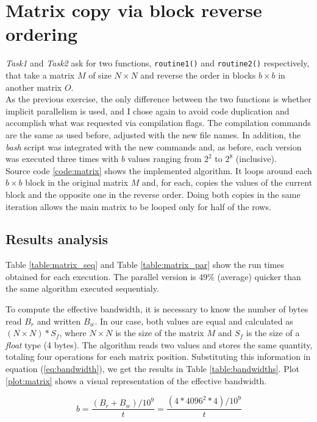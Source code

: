 \section{Matrix copy via block reverse ordering}
\textit{Task1} and \textit{Task2} ask for two functions, \texttt{routine1()} and \texttt{routine2()} respectively, that %
take a matrix $M$ of size $N\times N$ and reverse the order in blocks $b\times b$ in another matrix $O$.\\%
As the previous exercise, the only difference between the two functions is whether implicit parallelism is used, %
and I chose again to avoid code duplication and accomplish what was requested via compilation flags.
The compilation commands are the same as used before, adjusted with the new file names. In addition, the \textit{bash} %
script was integrated with the new commands and, as before, each version was executed three times with $b$ values ranging %
from $2^2$ to $2^8$ (inclusive).\\%
Source code \ref{code:matrix} shows the implemented algorithm. It loops around each $b\times b$ block in the original %
matrix $M$ and, for each, copies the values of the current block and the opposite one in the reverse order. Doing both %
copies in the same iteration allows the main matrix to be looped only for half of the rows.


\subsection*{Results analysis}
Table \ref{table:matrix_seq} and Table \ref{table:matrix_par} show the run times obtained for each execution. The parallel %
version is 49\% (average) quicker than the same algorithm executed sequentialy.%

\begin{table}[h!tb]
    \centering
    \parbox{.45\linewidth}{
    }
    \parbox{.50\linewidth}{
    }
\end{table}

To compute the effective bandwidth, it is necessary to know the number of bytes read $B_r$ and written $B_w$. In our %
case, both values are equal and calculated as $(N\times N) * S_f$, where $N\times N$ is the size of the matrix $M$ and %
$S_f$ is the size of a \textit{float} type (4 bytes). The algorithm reads two values and stores the same %
quantity, totaling four operations for each matrix position. Substituting this information in equation (\ref{eq:bandwidth}), %
we get the results in Table \ref{table:bandwidths}. Plot \ref{plot:matrix} shows a visual representation of the effective %
bandwidth.

\begin{equation}
    \label{eq:bandwidth}
    b=\frac{(B_r+B_w)/10^9}{t}=\frac{(4*4096^2*4)/10^9}{t}
\end{equation}


